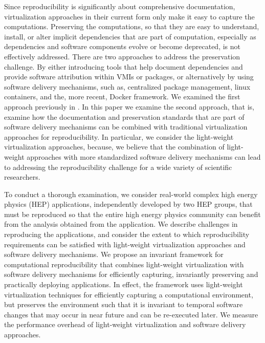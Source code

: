 Since reproducibility is significantly about comprehensive documentation, virtualization approaches in their current form only make it easy to capture the computations. Preserving the computations, so that they are easy to understand, install, or alter implicit dependencies that are part of computation, especially as dependencies and software components evolve or become deprecated, is not effectively addressed. There are two approaches to address the preservation challenge. By either introducing tools that help document dependencies and provide software attribution within VMIs or packages, or alternatively by using software delivery mechanisms, such as, centralized package management, linux containers, and the, more recent, Docker framework. We examined the first approach previously in \cite{}. In this paper we examine the second approach, that is, examine how the documentation and preservation standards that are part of software delivery mechanisms can be combined with traditional virtualization approaches for reproducibility. In particular, we consider the light-weight virtualization approaches, because, we believe that the combination of light-weight approaches with more standardized software delivery mechanisms can lead to addressing the reproducibility challenge for a wide variety of scientific researchers. 

To conduct a thorough examination, we consider real-world complex high energy physics (HEP) applications, independently developed by two HEP groups, that must be reproduced so that the entire high energy physics community can benefit from the analysis obtained from the application. We describe challenges in reproducing the applications, and consider the extent to which reproducibility requirements can be satisfied with light-weight virtualization approaches and software delivery mechanisms. We propose an invariant framework for computational reproducibility that combines light-weight virtualization with software delivery mechanisms for efficiently capturing, invariantly preserving and practically deploying applications. In effect, the framework uses light-weight virtualization techniques for efficiently capturing a computational environment, but preserves the environment such that it is invariant to temporal software changes that may occur in near future and can be re-executed later. We measure the performance overhead of  light-weight virtualization and software delivery approaches. 

